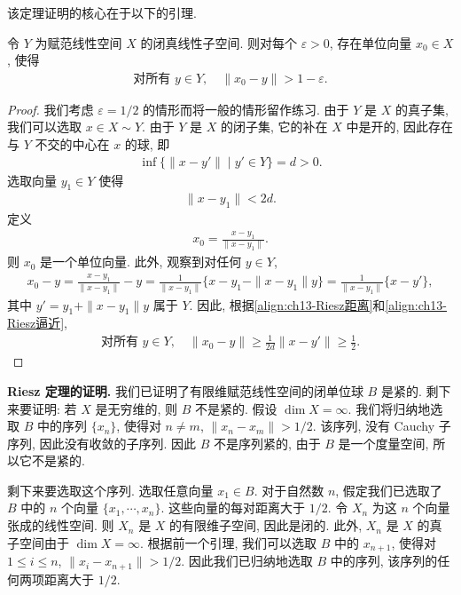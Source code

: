 \documentclass[../../main.tex]{subfiles}
\begin{document}
该定理证明的核心在于以下的引理.

\begin{lemma}[Riesz 引理]\label{lemma:ch13-Riesz引理}
令 $Y$ 为赋范线性空间 $X$ 的闭真线性子空间. 则对每个 $\varepsilon>0$, 存在单位向量 $x_{0}\in X$, 使得
\begin{align*}
\text{对所有 }y\in Y,\quad\|x_{0}-y\|>1-\varepsilon.
\end{align*}
\end{lemma}

\begin{proof}
我们考虑 $\varepsilon=1/2$ 的情形而将一般的情形留作练习. 由于 $Y$ 是 $X$ 的真子集, 我们可以选取 $x\in X\sim Y$. 由于 $Y$ 是 $X$ 的闭子集, 它的补在 $X$ 中是开的, 因此存在与 $Y$ 不交的中心在 $x$ 的球, 即
\begin{align}
\inf\{\|x-y'\|\mid y'\in Y\}=d>0.\label{align:ch13-Riesz距离}
\end{align}
选取向量 $y_{1}\in Y$ 使得
\begin{align}
\|x-y_{1}\|<2d.\label{align:ch13-Riesz逼近}
\end{align}
定义
\begin{align*}
x_{0}=\frac{x-y_{1}}{\|x-y_{1}\|}.
\end{align*}
则 $x_{0}$ 是一个单位向量. 此外, 观察到对任何 $y\in Y$,
\begin{align*}
x_{0}-y=\frac{x-y_{1}}{\|x-y_{1}\|}-y=\frac{1}{\|x-y_{1}\|}\{x-y_{1}-\|x-y_{1}\|y\}=\frac{1}{\|x-y_{1}\|}\{x-y'\},
\end{align*}
其中 $y'=y_{1}+\|x-y_{1}\|y$ 属于 $Y$. 因此, 根据\eqref{align:ch13-Riesz距离}和\eqref{align:ch13-Riesz逼近},
\begin{align*}
\text{对所有 }y\in Y,\quad\|x_{0}-y\|\geqslant\frac{1}{2d}\|x-y'\|\geqslant\frac{1}{2}.
\end{align*}
\end{proof}

\textbf{Riesz 定理的证明.} 我们已证明了有限维赋范线性空间的闭单位球 $B$ 是紧的. 剩下来要证明: 若 $X$ 是无穷维的, 则 $B$ 不是紧的. 假设 $\dim X=\infty$. 我们将归纳地选取 $B$ 中的序列 $\{x_{n}\}$, 使得对 $n\neq m$, $\|x_{n}-x_{m}\|>1/2$. 该序列, 没有 Cauchy 子序列, 因此没有收敛的子序列. 因此 $B$ 不是序列紧的, 由于 $B$ 是一个度量空间, 所以它不是紧的.

剩下来要选取这个序列. 选取任意向量 $x_{1}\in B$. 对于自然数 $n$, 假定我们已选取了 $B$ 中的 $n$ 个向量 $\{x_{1},\cdots,x_{n}\}$. 这些向量的每对距离大于 $1/2$. 令 $X_{n}$ 为这 $n$ 个向量张成的线性空间. 则 $X_{n}$ 是 $X$ 的有限维子空间, 因此是闭的. 此外, $X_{n}$ 是 $X$ 的真子空间由于 $\dim X=\infty$. 根据前一个引理, 我们可以选取 $B$ 中的 $x_{n+1}$, 使得对 $1\leqslant i\leqslant n$, $\|x_{i}-x_{n+1}\|>1/2$. 因此我们已归纳地选取 $B$ 中的序列, 该序列的任何两项距离大于 $1/2$.
\end{document}
